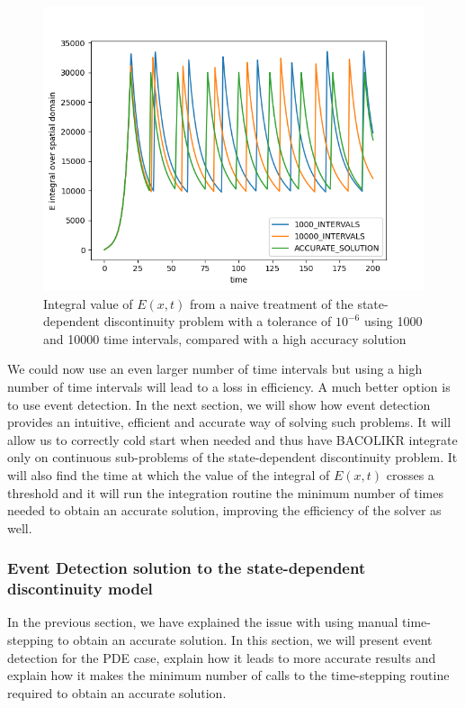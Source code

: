 \documentclass{article}
\begin{document}
\begin{figure}[H]
\centering
\includegraphics[width=0.7\linewidth]{./figures/pde_state_disc_naive_1000vs10000}
\caption{Integral value of $E(x, t)$ from a naive treatment of the state-dependent discontinuity problem with a tolerance of $10^{-6}$ using 1000 and 10000 time intervals, compared with a high accuracy solution}
\label{fig:pde_state_disc_naive_1000vs10000}
\end{figure}

We could now use an even larger number of time intervals but using a high number of time intervals will lead to a loss in efficiency. A much better option is to use event detection. In the next section, we will show how event detection provides an intuitive, efficient and accurate way of solving such problems. It will allow us to correctly cold start when needed and thus have BACOLIKR integrate only on continuous sub-problems of the state-dependent discontinuity problem. It will also find the time at which the value of the integral of $E(x, t)$ crosses a threshold and it will run the integration routine the minimum number of times needed to obtain an accurate solution, improving the efficiency of the solver as well.

\subsubsection{Event Detection solution to the state-dependent discontinuity model}
\label{subsubsection:pde_state_event_detection}
In the previous section, we have explained the issue with using manual time-stepping to obtain an accurate solution. In this section, we will present event detection for the PDE case, explain how it leads to more accurate results and explain how it makes the minimum number of calls to the time-stepping routine required to obtain an accurate solution.
\end{document}
